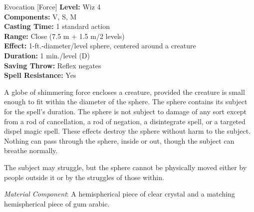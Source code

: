 {Evocation [Force]}
{
	\textbf{Level:}
	Wiz 4\\
	\textbf{Components:}
	V, S, M\\
	\textbf{Casting Time:}
	1 standard action\\
	\textbf{Range:}
	Close (7.5 m + 1.5 m/2 levels)\\
	\textbf{Effect:}
	1-ft.-diameter/level sphere, centered around a creature\\
	\textbf{Duration:}
	1 min./level (D)\\
	\textbf{Saving Throw:}
	Reflex negates\\
	\textbf{Spell Resistance:}
	Yes\\
}
{
	A globe of shimmering force encloses a creature, provided the creature is small enough to fit within the diameter of the sphere. The sphere contains its subject for the spell's duration. The sphere is not subject to damage of any sort except from a rod of cancellation, a rod of negation, a disintegrate spell, or a targeted dispel magic spell. These effects destroy the sphere without harm to the subject. Nothing can pass through the sphere, inside or out, though the subject can breathe normally.

	The subject may struggle, but the sphere cannot be physically moved either by people outside it or by the struggles of those within.

	\textit{Material Component}:
	A hemispherical piece of clear crystal and a matching hemispherical piece of gum arabic.

}
